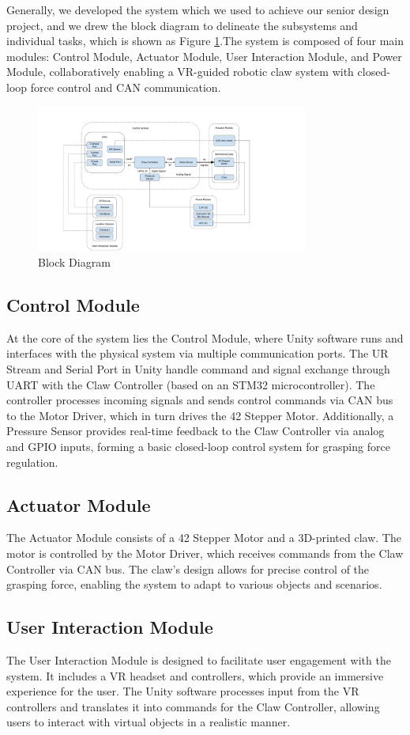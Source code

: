 Generally, we developed the system which we used to achieve our senior design 
project, and we drew the block diagram to delineate the subsystems and individual
tasks, which is shown as Figure \ref{fig:block_diagram}.The system is composed of 
four main modules: Control Module, Actuator Module, User Interaction Module, and 
Power Module, collaboratively enabling a VR-guided robotic claw system with closed-loop force control and CAN communication.
\begin{figure}[h]
    \centering
    \includegraphics[width=0.8\textwidth]{Figures/Block Diagram 2.0.jpg}
    \caption{Block Diagram}
    \label{fig:block_diagram}
\end{figure}
\subsection*{Control Module}
At the core of the system lies the Control Module, where Unity software runs and interfaces with the physical system via multiple communication ports. The UR Stream and Serial Port in Unity handle command and signal exchange through UART with the Claw Controller (based on an STM32 microcontroller). The controller processes incoming signals and sends control commands via CAN bus to the Motor Driver, which in turn drives the 42 Stepper Motor. Additionally, a Pressure Sensor provides real-time feedback to the Claw Controller via analog and GPIO inputs, forming a basic closed-loop control system for grasping force regulation.
\subsection*{Actuator Module}
The Actuator Module consists of a 42 Stepper Motor and a 3D-printed claw. The motor is controlled by the Motor Driver, which receives commands from the Claw Controller via CAN bus. The claw's design allows for precise control of the grasping force, enabling the system to adapt to various objects and scenarios.
\subsection*{User Interaction Module}
The User Interaction Module is designed to facilitate user engagement with the system. It includes a VR headset and controllers, which provide an immersive experience for the user. The Unity software processes input from the VR controllers and translates it into commands for the Claw Controller, allowing users to interact with virtual objects in a realistic manner.

